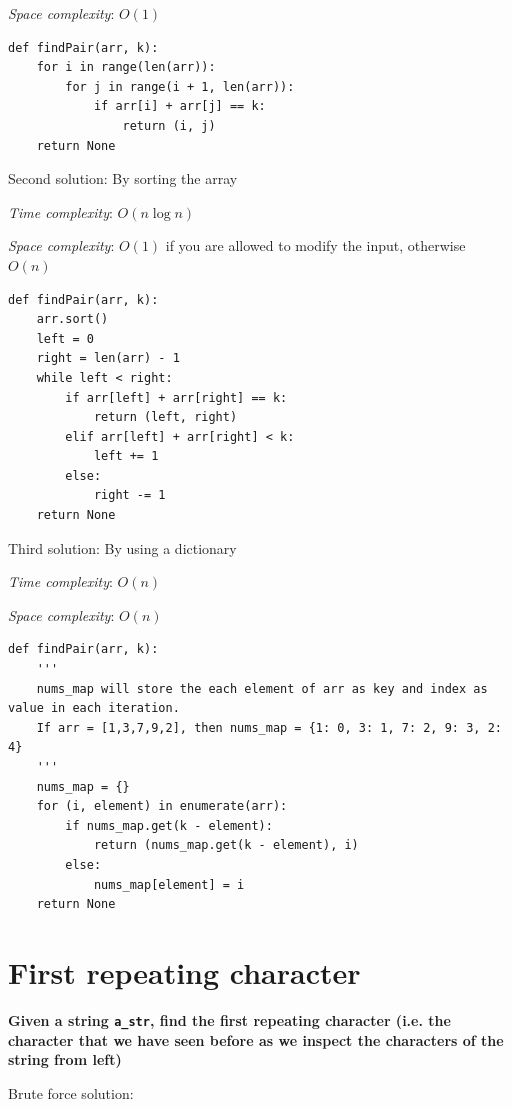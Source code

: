 \documentclass[a4paper,11pt]{book}
\begin{document}
\noindent \textit{Space complexity}: $O(1)$

\begin{lstlisting}
def findPair(arr, k):
    for i in range(len(arr)):
        for j in range(i + 1, len(arr)):
            if arr[i] + arr[j] == k:
                return (i, j)
    return None
\end{lstlisting}

\noindent Second solution: By sorting the array

\noindent \textit{Time complexity}: $O(n\log n)$

\noindent \textit{Space complexity}: $O(1)$ if you are allowed to modify the input, otherwise $O(n)$

\begin{lstlisting}
def findPair(arr, k):
    arr.sort()
    left = 0
    right = len(arr) - 1
    while left < right:
        if arr[left] + arr[right] == k:
            return (left, right)
        elif arr[left] + arr[right] < k:
            left += 1
        else:
            right -= 1
    return None
\end{lstlisting}

\noindent Third solution: By using a dictionary

\noindent \textit{Time complexity}: $O(n)$

\noindent \textit{Space complexity}: $O(n)$

\begin{lstlisting}
def findPair(arr, k):
    '''
    nums_map will store the each element of arr as key and index as value in each iteration.
    If arr = [1,3,7,9,2], then nums_map = {1: 0, 3: 1, 7: 2, 9: 3, 2: 4}
    '''
    nums_map = {}
    for (i, element) in enumerate(arr):
        if nums_map.get(k - element):
            return (nums_map.get(k - element), i)
        else:
            nums_map[element] = i
    return None
\end{lstlisting}

\newpage
\section{First repeating character}

\textbf{Given a string \lstinline{a_str}, find the first repeating character (i.e. the character that we have seen before as we inspect the characters of the string from left)}
\vspace{5mm}

\noindent Brute force solution:
\end{document}
